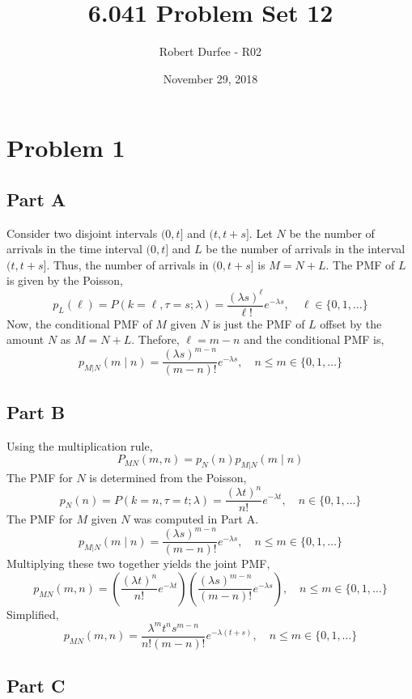 \documentclass{article}
\title{6.041 Problem Set 12}
\author{Robert Durfee - R02}
\date{November 29, 2018}
\begin{document}
\maketitle

\section*{Problem 1}

\subsection*{Part A}

Consider two disjoint intervals $(0, t]$ and $(t, t + s]$. Let $N$ be the
number of arrivals in the time interval $(0, t]$ and $L$ be the number
of arrivals in the interval $(t, t + s]$. Thus, the number of arrivals in $(0,
t + s]$ is $M = N + L$. The PMF of $L$ is given by the Poisson,
$$ p_L(\ell) = P(k = \ell, \tau = s; \lambda) = \frac{(\lambda
s)^\ell}{\ell!} e^{-\lambda s},\quad \ell \in \{0, 1, \ldots\}$$
Now, the conditional PMF of $M$ given $N$ is just the PMF of $L$ offset by
the amount $N$ as $M = N + L$. Thefore, $\ell = m - n$ and the conditional
PMF is,
$$ p_{M|N}(m \mid n) = \frac{(\lambda s)^{m - n}}{(m - n)!} e^{-\lambda
s},\quad n \leq m \in \{0, 1, \ldots\} $$

\subsection*{Part B}

Using the multiplication rule,
$$ P_{MN}(m, n) = p_N(n) p_{M|N}(m \mid n) $$
The PMF for $N$ is determined from the Poisson,
$$ p_N(n) = P(k = n, \tau = t; \lambda) = \frac{(\lambda t)^n}{n!}
e^{-\lambda t},\quad n \in \{0, 1, \ldots\} $$
The PMF for $M$ given $N$ was computed in Part A.
$$ p_{M|N}(m \mid n) = \frac{(\lambda s)^{m - n}}{(m - n)!} e^{-\lambda
s},\quad n \leq m \in \{0, 1, \ldots\} $$
Multiplying these two together yields the joint PMF,
$$ p_{MN}(m, n) = \left(\frac{(\lambda t)^n}{n!} e^{-\lambda t}\right)
\left(\frac{(\lambda s)^{m - n}}{(m - n)!} e^{-\lambda s}\right),\quad n \leq
m \in \{0, 1, \ldots\} $$
Simplified,
$$ p_{MN}(m, n) = \frac{\lambda^m t^n s^{m - n}}{n!(m - n)!} e^{-\lambda(t +
s)},\quad n \leq m \in \{0, 1, \ldots\} $$

\subsection*{Part C}
\end{document}
